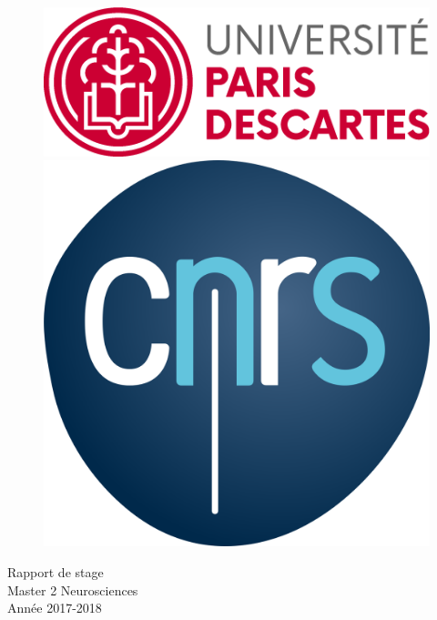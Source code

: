 \begin{center}

\begin{figure}[!h] %
	\begin{minipage}{0.48\textwidth}
		\raggedright %
		\includegraphics*[height=0.1\textheight]{./Images/Logo_P5.png}
	\end{minipage}%
	\hfill
	\begin{minipage}{0.48\textwidth}
		\raggedleft %
		\includegraphics*[height=0.1\textheight]{./Images/Logo_CNRS.png}
	\end{minipage}%
\end{figure}
\vspace*{1.5cm}

Rapport de stage\\
Master 2 Neurosciences\\
Année 2017-2018\\
\vspace{1cm}



\end{center}
